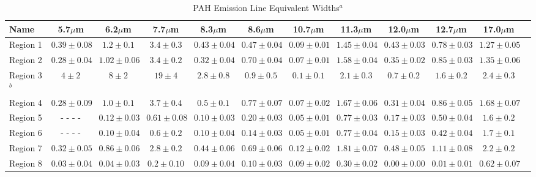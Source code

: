 \begin{table}
 \centering
 \begin{minipage}{200mm}
\caption{PAH Emission Line Equivalent Widths$^a$}
  \begin{tabular}{l c c  c  c  c  c  c  c  c  c c }
  \hline {Name  }&{5.7$\mu$m  }&{6.2$\mu$m  }&{7.7$\mu$m  }&{8.3$\mu$m  }&{8.6$\mu$m  }&{10.7$\mu$m  }&{11.3$\mu$m  }&{12.0$\mu$m  }&{12.7$\mu$m  }&{17.0$\mu$m  } 
   \\
 \hline
 Region 1 &$0.39\pm0.08$        & $1.2\pm0.1$             & $3.4\pm0.3$        & $0.43\pm0.04$        & $0.47\pm0.04$        & $0.09\pm0.01$        & $1.45\pm0.04$        & $0.43\pm0.03$        & $0.78\pm0.03$              & $1.27\pm0.05$        \\
 Region 2 &$0.28\pm0.04$        & $1.02\pm0.06$        & $3.4\pm0.2$        & $0.32\pm0.04$        & $0.70\pm0.04$        & $0.07\pm0.01$        & $1.58\pm0.04$        & $0.35\pm0.02$        & $0.85\pm0.03$              & $1.35\pm0.06$        \\
 Region 3$^b$ &$4\pm2$           & $8\pm2$                   & $19\pm4$            & $2.8\pm0.8$             & $0.9\pm0.5$             & $0.1\pm0.1$            & $2.1\pm0.3$             & $0.7\pm0.2$            & $1.6\pm0.2$                   & $2.4\pm0.3$        \\
 Region 4 &$0.28\pm0.09$        & $1.0\pm0.1$             & $3.7\pm0.4$       & $0.5\pm0.1$              & $0.77\pm0.07$        & $0.07\pm0.02$        & $1.67\pm0.06$        & $0.31\pm0.04$        & $0.86\pm0.05$             & $1.68\pm0.07$        \\
 Region 5 & - - - -                          & $0.12\pm0.03$        & $0.61\pm0.08$   & $0.10\pm0.03$        & $0.20\pm0.03$        & $0.05\pm0.01$        & $0.77\pm0.03$        & $0.17\pm0.03$        & $0.50\pm0.04$            & $1.6\pm0.2$        \\
 Region 6 & - - - -                          & $0.10\pm0.04$        & $0.6\pm0.2$        & $0.10\pm0.04$        & $0.14\pm0.03$        & $0.05\pm0.01$        & $0.77\pm0.04$        & $0.15\pm0.03$        & $0.42\pm0.04$            & $1.7\pm0.1$        \\
 Region 7 &$0.32\pm0.05$        & $0.86\pm0.06$        & $2.8\pm0.2$        & $0.44\pm0.06$        & $0.69\pm0.06$        & $0.12\pm0.02$        & $1.81\pm0.07$        & $0.48\pm0.05$        & $1.11\pm0.08$            & $2.2\pm0.2$        \\
 Region 8 &$0.03\pm0.04$        & $0.04\pm0.03$        & $0.2\pm0.10$      & $0.09\pm0.04$        & $0.10\pm0.03$        & $0.09\pm0.02$        & $0.30\pm0.02$        & $0.00\pm0.00$        & $0.01\pm0.01$            & $0.62\pm0.07$        \\

\end{tabular}
\end{minipage}
\end{table}
